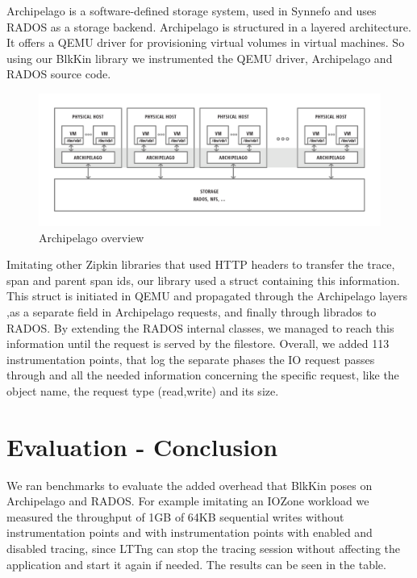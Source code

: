 \documentclass[11pt,journal,compsoc]{IEEEtran}
\begin{document}
Archipelago is a software-defined storage system, used in Synnefo\cite{synnefo}
and uses RADOS as a storage backend. Archipelago is structured in a layered
architecture. It offers a QEMU driver for provisioning virtual volumes in
virtual machines. So using our BlkKin library we instrumented the QEMU driver,
Archipelago and RADOS source code.

\begin{figure}[h!]
  \centering
  \includegraphics[scale=0.3]{figs/archipelago-overview.png}
  \caption{Archipelago overview}
  \label{fig:archipelago}
\end{figure}

Imitating other Zipkin libraries that used HTTP headers to transfer the trace,
span and parent span ids, our library used a struct containing this
information.  This struct is initiated in QEMU and propagated through the
Archipelago layers ,as a separate field in Archipelago requests, and finally
through librados to RADOS. By extending the RADOS internal classes, we managed
to reach this information until the request is served by the filestore.
Overall, we added 113 instrumentation points, that log the separate phases the
IO request passes through and all the needed information concerning the
specific request, like the object name, the request type (read,write) and its
size.

\section{Evaluation - Conclusion}

We ran benchmarks to evaluate the added overhead that BlkKin poses on
Archipelago and RADOS. For example imitating an IOZone workload we measured the
throughput of 1GB of 64KB sequential writes without instrumentation points and
with instrumentation points with enabled and disabled tracing, since LTTng can
stop the tracing session without affecting the application and start it again if
needed. The results can be seen in the table.
\end{document}

